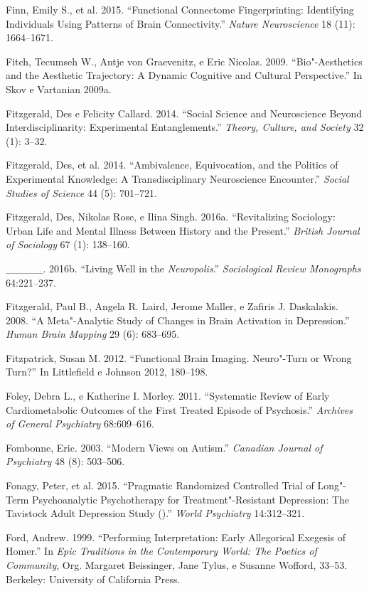 {\begin{Parskip}
Finn, Emily S., et al. 2015. ``Functional Connectome Fingerprinting:
Identifying Individuals Using Patterns of Brain Connectivity.''
\emph{Nature Neuroscience} 18 (11): 1664--1671.

Fitch, Tecumseh W., Antje von Graevenitz, e Eric Nicolas. 2009.
``Bio"-Aesthetics and the Aesthetic Trajectory: A Dynamic Cognitive and
Cultural Perspective.'' In Skov e Vartanian 2009a.

Fitzgerald, Des e Felicity Callard. 2014. ``Social Science and
Neuroscience Beyond Interdisciplinarity: Experimental Entanglements.''
\emph{Theory, Culture, and Society} 32 (1): 3--32.

Fitzgerald, Des, et al. 2014. ``Ambivalence, Equivocation, and the
Politics of Experimental Knowledge: A Transdisciplinary Neuroscience
Encounter.'' \emph{Social Studies of Science} 44 (5): 701--721.

Fitzgerald, Des, Nikolas Rose, e Ilina Singh. 2016a. ``Revitalizing
Sociology: Urban Life and Mental Illness Between History and the
Present.'' \emph{British Journal of Sociology} 67 (1): 138--160.

\_\_\_\_\_. 2016b. ``Living Well in the \emph{Neuropolis}.''
\emph{Sociological Review Monographs} 64:221--237.

Fitzgerald, Paul B., Angela R. Laird, Jerome Maller, e Zafiris J.
Daskalakis. 2008. ``A Meta"-Analytic Study of Changes in Brain Activation
in Depression.'' \emph{Human Brain Mapping} 29 (6): 683--695.

Fitzpatrick, Susan M. 2012. ``Functional Brain Imaging. Neuro"-Turn or
Wrong Turn?'' In Littlefield e Johnson 2012, 180--198.

Foley, Debra L., e Katherine I. Morley. 2011. ``Systematic Review of
Early Cardiometabolic Outcomes of the First Treated Episode of
Psychosis.'' \emph{Archives of General Psychiatry} 68:609--616.

Fombonne, Eric. 2003. ``Modern Views on Autism.'' \emph{Canadian Journal
of Psychiatry} 48 (8): 503--506.

Fonagy, Peter, et al. 2015. ``Pragmatic Randomized Controlled Trial of
Long"-Term Psychoanalytic Psychotherapy for Treatment"-Resistant
Depression: The Tavistock Adult Depression Study ().'' \emph{World
Psychiatry} 14:312--321.

Ford, Andrew. 1999. ``Performing Interpretation: Early Allegorical
Exegesis of Homer.'' In \emph{Epic Traditions in the Contemporary World:
The Poetics of Community}, Org. Margaret Beissinger, Jane Tylus, e
Susanne Wofford, 33--53. Berkeley: University of California Press.


\end{Parskip}}

